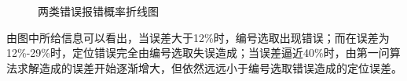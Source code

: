 \documentclass{ctexart}
\begin{document}
\begin{figure}[htbp]
  \center
  
  \hspace{-20pt}%
  \caption{两类错误报错概率折线图}
  \label{两类错误报错概率折线图}
  \end{figure}

  由图中所给信息可以看出，当误差大于12\%时，编号选取出现错误；而在误差为12\%-29\%时，定位错误完全由编号选取失误造成；当误差逼近40\%时，由第一问算法求解造成的误差开始逐渐增大，但依然远远小于编号选取错误造成的定位误差。
\end{document}
